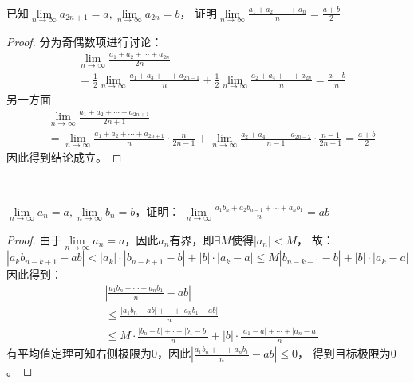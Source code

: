 ~

\begin{exercise}[奇偶子列推广]
  已知$\lim \limits _{n \rightarrow \infty} a_{2n+1} = a, \lim \limits _{n \rightarrow \infty} a_{2n} = b$，
  证明$\lim \limits _{n \rightarrow \infty} \frac{a_1 + a_2 + \cdots + a_n}{n} = \frac{a+b}{2}$
\end{exercise}

\begin{proof}
  分为奇偶数项进行讨论：
  \begin{align*}
    &\lim \limits _{n \rightarrow \infty} \frac{a_1 + a_2 + \cdots + a_{2n}}{2n} \\
    &= \frac{1}{2}\lim \limits _{n \rightarrow \infty} \frac{a_1 + a_3 + \cdots + a_{2n-1}}{n}  + \frac{1}{2} \lim \limits _{n \rightarrow \infty} \frac{a_2 + a_4 + \cdots + a_{2n}}{n} = \frac{a+b}{n}
  \end{align*}
  另一方面
  \begin{align*}
    &\lim \limits _{n \rightarrow \infty} \frac{a_1 + a_2 + \cdots + a_{2n+1}}{2n+1} \\
    &= \lim \limits _{n \rightarrow \infty} \frac{a_1 + a_2 + \cdots + a_{2n+1}}{n} \cdot \frac{n}{2n-1} + \lim \limits _{n \rightarrow \infty} \frac{a_2 + a_4 + \cdots + a_{2n-2}}{n-1}\cdot \frac{n-1}{2n-1} = \frac{a+b}{2}
  \end{align*}
  因此得到结论成立。
\end{proof}

~

\begin{exercise}[倒乘推广]
  $\lim \limits _{n \rightarrow \infty} a_n = a, \lim \limits _{n \rightarrow \infty} b_n = b$，证明：
  $\lim \limits _{n \rightarrow \infty} \frac{a_1b_n + a_2b_{n-1} + \cdots + a_nb_1}{n} = ab$
\end{exercise}

\begin{proof}
  由于$\lim \limits _{n \rightarrow \infty} a_n = a$，因此$a_n$有界，即$\exists M$使得$|a_n| < M$，
  故：
  \begin{equation*}
    |a_kb_{n-k+1} - ab| < |a_k|\cdot |b_{n-k+1} - b| + |b|\cdot |a_k - a| \leq M|b_{n-k+1} - b| + |b|\cdot |a_k - a|
  \end{equation*}
  因此得到：
  \begin{align*}
    & \left|\frac{a_1b_n + \cdots + a_nb_1}{n} - ab\right|\\
    & \leq \frac{|a_1b_n - ab| + \cdots + |a_nb_1 - ab|}{n}\\
    & \leq M \cdot \frac{|b_n - b| + \cdot + |b_1 - b|}{n} + |b| \cdot \frac{|a_1 - a| + \cdots + |a_n - a|}{n}
  \end{align*}
  有平均值定理可知右侧极限为$0$，因此$\left| \frac{a_1b_n + \cdots + a_nb_1}{n} - ab \right| \leq 0$，
  得到目标极限为$0$。
\end{proof}

